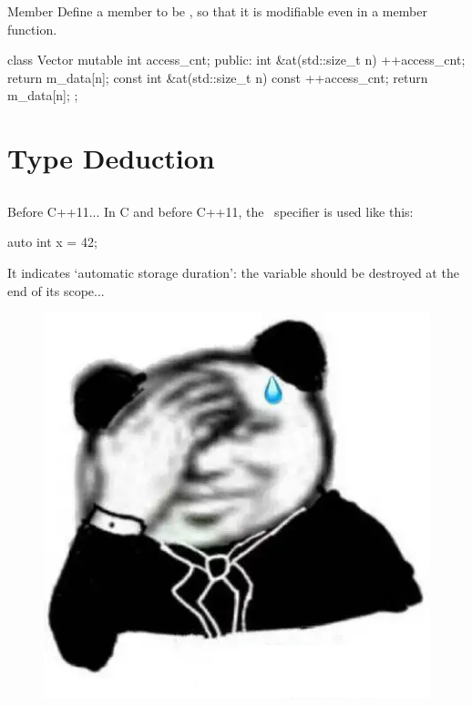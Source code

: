 \documentclass{beamer}
\begin{document}
\begin{frame}[fragile]{ Member}
    Define a member to be , so that it is modifiable even in a \const member function.
    \begin{cpp}
class Vector {
  mutable int access_cnt;
 public:
  int &at(std::size_t n) {
    ++access_cnt;
    return m_data[n];
  }
  const int &at(std::size_t n) const {
    ++access_cnt;
    return m_data[n];
  }
};
    \end{cpp}
\end{frame}

\section{Type Deduction}

\subsection{}

\newcommand{\auto}{\bluett{auto}~}

\begin{frame}[fragile]{Before C++11...}
    In C and before C++11, the \auto specifier is used like this:
    \begin{cpp}
auto int x = 42;
    \end{cpp}
    It indicates `automatic storage duration': the variable  should be destroyed at the end of its scope...
    \begin{figure}[h]
        \centering
        \includegraphics[scale=0.25]{figures/stupid.png}
    \end{figure}
\end{frame}
\end{document}
